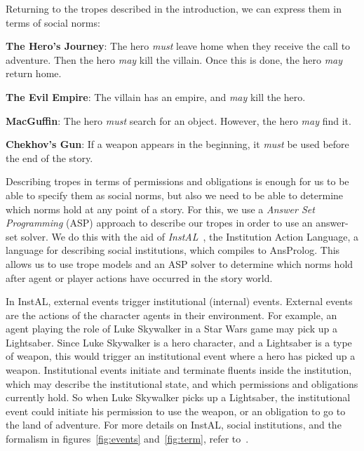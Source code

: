 Returning to the tropes described in the introduction, we can express them in terms of social norms:

\begin{compactitem}
  \item \textbf{The Hero's Journey}: The hero \emph{must} leave home when they receive the call to adventure. Then the hero \emph{may} kill the villain. Once this is done, the hero \emph{may} return home.
  \item \textbf{The Evil Empire}: The villain has an empire, and \emph{may} kill the hero.
  \item \textbf{MacGuffin}: The hero \emph{must} search for an object. However, the hero \emph{may} find it.
  \item \textbf{Chekhov's Gun}: If a weapon appears in the beginning, it \emph{must} be used before the end of the story.
\end{compactitem}

Describing tropes in terms of permissions and obligations is enough for us to be able to specify them as social norms, but also we need to be able to determine which norms hold at any point of a story. For this, we use a \emph{Answer Set Programming} (ASP) approach to describe our tropes in order to use an answer-set solver. We do this with the aid of \emph{InstAL}~\citep{cliffe2007specifying}, the Institution Action Language, a language for describing social institutions, which compiles to AnsProlog. This allows us to use trope models and an ASP solver to determine which norms hold after agent or player actions have occurred in the story world.

In InstAL, external events trigger institutional (internal) events. External events are the actions of the character agents in their environment. For example, an agent playing the role of Luke Skywalker in a Star Wars game may pick up a Lightsaber. Since Luke Skywalker is a hero character, and a Lightsaber is a type of weapon, this would trigger an institutional event where a hero has picked up a weapon. Institutional events initiate and terminate fluents inside the institution, which may describe the institutional state, and which permissions and obligations currently hold. So when Luke Skywalker picks up a Lightsaber, the institutional event could initiate his permission to use the weapon, or an obligation to go to the land of adventure.
For more details on InstAL, social institutions, and the formalism in figures~\ref{fig:events} and~\ref{fig:term}, refer to~\citep{cliffe2007specifying}.

